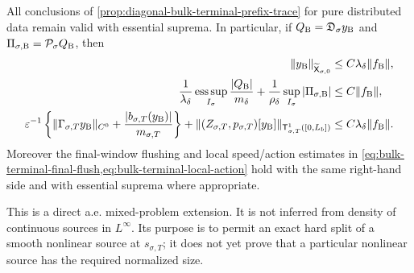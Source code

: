 \begin{proposition}
All conclusions of
\cref{prop:diagonal-bulk-terminal-prefix-trace} for pure distributed data
remain valid with essential suprema.  In particular, if
\(Q_{\rm B}=\mathfrak D_\sigma y_{\rm B}\) and
\(\Pi_{\sigma,\rm B}=\mathcal P_\sigma Q_{\rm B}\), then
\begin{align}
 \|y_{\rm B}\|_{\widetilde{\mathsf X}_{\sigma,0}}
 &\le C\lambda_\delta\|f_{\rm B}\|,
                                                        \label{eq:bulk-pw-global-bound}\\
 \frac1{\lambda_\delta}
   \operatorname*{ess\,sup}_{I_\sigma}
      \frac{|Q_{\rm B}|}{m_\delta}
 +\frac1{\rho_\delta}
   \sup_{I_\sigma}|\Pi_{\sigma,\rm B}|
 &\le C\|f_{\rm B}\|,                           \label{eq:bulk-pw-prefix-bound}\\
 \varepsilon^{-1}\left\{
   \|\Gamma_{\sigma,T}y_{\rm B}\|_{C^0}
   +\frac{|b_{\sigma,T}(y_{\rm B})|}{m_{\sigma,T}}
                  \right\}
 +\|(Z_{\sigma,T},p_{\sigma,T})[y_{\rm B}]\|_
       {\mathsf T_{\sigma,T}^1([0,L_b])}
 &\le C\lambda_\delta\|f_{\rm B}\|.           \label{eq:bulk-pw-terminal-bound}
\end{align}
Moreover the final-window flushing and local speed/action estimates in
\cref{eq:bulk-terminal-final-flush,eq:bulk-terminal-local-action}
hold with the same right-hand side and with essential suprema where
appropriate.

This is a direct a.e. mixed-problem extension.  It is not inferred from
density of continuous sources in \(L^\infty\).  Its purpose is to permit an
exact hard split of a smooth nonlinear source at
\(s_{\sigma,T}\); it does not yet prove that a particular nonlinear
source has the required normalized size.
\end{proposition}


